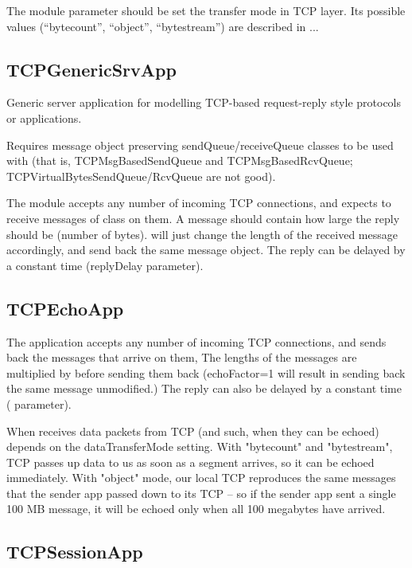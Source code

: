 The module parameter  should be set the transfer mode in TCP layer.
Its possible values (``bytecount'', ``object'', ``bytestream'') are described in ...

\subsection{TCPGenericSrvApp}

Generic server application for modelling TCP-based request-reply style
protocols or applications.

Requires message object preserving sendQueue/receiveQueue classes
to be used with  (that is, TCPMsgBasedSendQueue and TCPMsgBasedRcvQueue;
TCPVirtualBytesSendQueue/RcvQueue are not good).

The module accepts any number of incoming TCP connections, and expects
to receive messages of class  on them. A message should
contain how large the reply should be (number of bytes). 
will just change the length of the received message accordingly, and send
back the same message object. The reply can be delayed by a constant time
(replyDelay parameter).

\subsection{TCPEchoApp}

The  application accepts any number of incoming TCP
connections, and sends back the messages that arrive on them, The lengths of the
messages are multiplied by  before sending them back (echoFactor=1
will result in sending back the same message unmodified.) The reply can also be
delayed by a constant time ( parameter).

When  receives data packets from TCP (and such, when they can be
echoed) depends on the dataTransferMode setting.
With "bytecount" and "bytestream", TCP passes up data to us
as soon as a segment arrives, so it can be echoed immediately.
With "object" mode, our local TCP reproduces the same
messages that the sender app passed down to its TCP -- so if the sender
app sent a single 100 MB message, it will be echoed only when all
100 megabytes have arrived.

\subsection{TCPSessionApp}

